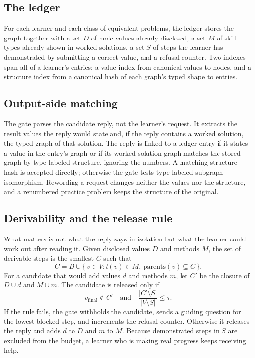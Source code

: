 \documentclass[11pt]{article}
\begin{document}
\subsection{The ledger}
For each learner and each class of equivalent problems, the ledger stores the graph together with a set $D$ of node values already disclosed, a set $M$ of skill types already shown in worked solutions, a set $S$ of steps the learner has demonstrated by submitting a correct value, and a refusal counter. Two indexes span all of a learner's entries: a value index from canonical values to nodes, and a structure index from a canonical hash of each graph's typed shape to entries.

\subsection{Output-side matching}
The gate parses the candidate reply, not the learner's request. It extracts the result values the reply would state and, if the reply contains a worked solution, the typed graph of that solution. The reply is linked to a ledger entry if it states a value in the entry's graph or if its worked-solution graph matches the stored graph by type-labeled structure, ignoring the numbers. A matching structure hash is accepted directly; otherwise the gate tests type-labeled subgraph isomorphism. Rewording a request changes neither the values nor the structure, and a renumbered practice problem keeps the structure of the original.

\subsection{Derivability and the release rule}
What matters is not what the reply says in isolation but what the learner could work out after reading it. Given disclosed values $D$ and methods $M$, the set of derivable steps is the smallest $C$ such that
\begin{equation}
C = D \cup \{\, v \in V : t(v) \in M,\ \mathrm{parents}(v) \subseteq C \,\}.
\end{equation}
For a candidate that would add values $d$ and methods $m$, let $C'$ be the closure of $D \cup d$ and $M \cup m$. The candidate is released only if
\begin{equation}
v_{\text{final}} \notin C' \quad\text{and}\quad \frac{|C' \setminus S|}{|V \setminus S|} \le \tau .
\end{equation}
If the rule fails, the gate withholds the candidate, sends a guiding question for the lowest blocked step, and increments the refusal counter. Otherwise it releases the reply and adds $d$ to $D$ and $m$ to $M$. Because demonstrated steps in $S$ are excluded from the budget, a learner who is making real progress keeps receiving help.
\end{document}
